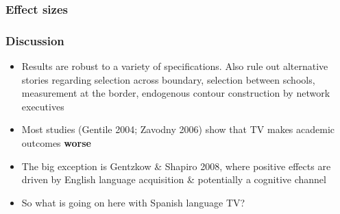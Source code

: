 \documentclass{beamer}
\begin{document}
\begin{frame}
\frametitle{Effect sizes}

\begin{center}
\end{center}
\end{frame}

\begin{frame}
\frametitle{Discussion}
\begin{itemize}
\item  Results are robust to a variety of specifications. Also rule out alternative stories regarding selection across boundary, selection between schools, measurement at the border, endogenous contour construction by network executives
\item Most studies {\footnotesize (Gentile 2004; Zavodny 2006)} show that TV makes academic outcomes \textbf{worse}
\item The big exception is Gentzkow \& Shapiro 2008, where positive effects are driven by English language acquisition \& potentially a cognitive channel
\item So what is going on here with Spanish language TV?
\end{itemize}
\end{frame}
\end{document}
